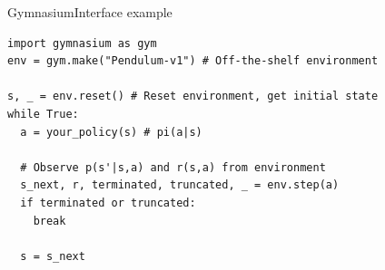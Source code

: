 \documentclass[aspectratio=1609,handout]{beamer}
\begin{document}
\begin{frame}[fragile]{Gymnasium}{Interface example}
\begin{verbatim}
import gymnasium as gym
env = gym.make("Pendulum-v1") # Off-the-shelf environment

s, _ = env.reset() # Reset environment, get initial state
while True:
  a = your_policy(s) # pi(a|s)

  # Observe p(s'|s,a) and r(s,a) from environment
  s_next, r, terminated, truncated, _ = env.step(a)
  if terminated or truncated:
    break

  s = s_next
\end{verbatim}
\end{frame}
\end{document}

